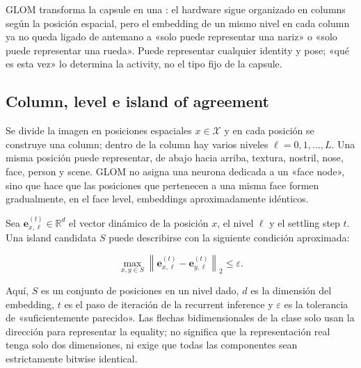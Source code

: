 
GLOM transforma la capsule en una : el hardware sigue organizado en columns según la posición espacial, pero el embedding de un mismo nivel en cada column ya no queda ligado de antemano a «solo puede representar una nariz» o «solo puede representar una rueda». Puede representar cualquier identity y pose; «qué es esta vez» lo determina la activity, no el tipo fijo de la capsule.

\subsection{Column, level e island of agreement}

Se divide la imagen en posiciones espaciales $x\in\mathcal X$ y en cada posición se construye una column; dentro de la column hay varios niveles $\ell=0,1,\ldots,L$. Una misma posición puede representar, de abajo hacia arriba, textura, nostril, nose, face, person y scene. GLOM no asigna una neurona dedicada a un «face node», sino que hace que las posiciones que pertenecen a una misma face formen gradualmente, en el face level, embeddings aproximadamente idénticos.


Sea $\mathbf e_{x,\ell}^{(t)}\in\mathbb R^d$ el vector dinámico de la posición $x$, el nivel $\ell$ y el settling step $t$. Una island candidata $S$ puede describirse con la siguiente condición aproximada:

\[
\max_{x,y\in S}\left\|\mathbf e_{x,\ell}^{(t)}-\mathbf e_{y,\ell}^{(t)}\right\|_2\le \varepsilon.
\]

Aquí, $S$ es un conjunto de posiciones en un nivel dado, $d$ es la dimensión del embedding, $t$ es el paso de iteración de la recurrent inference y $\varepsilon$ es la tolerancia de «suficientemente parecido». Las flechas bidimensionales de la clase solo usan la dirección para representar la equality; no significa que la representación real tenga solo dos dimensiones, ni exige que todas las componentes sean estrictamente bitwise identical.

